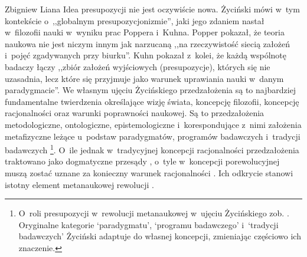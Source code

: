 \begin{artplenv}{Zbigniew Liana}
Idea presupozycji nie jest oczywiście nowa. Życiński
\parencite*[][s.~311n]{zycinski_granice_1993} %
 mówi w~tym kontekście o~,,globalnym presupozycjonizmie'', jaki jego zdaniem nastał w~filozofii nauki w~wyniku prac Poppera i~Kuhna. Popper pokazał, że teoria naukowa nie jest niczym innym jak narzucaną ,,na rzeczywistość siecią założeń i~pojęć zgadywanych przy biurku''. Kuhn pokazał z~kolei, że każdą wspólnotę badaczy łączy ,,zbiór założeń wyjściowych (presupozycje), których się nie uzasadnia, lecz które się przyjmuje jako warunek uprawiania nauki w~danym paradygmacie''. We własnym ujęciu Życińskiego przedzałożenia są to najbardziej fundamentalne twierdzenia określające wizję świata, koncepcję filozofii, koncepcję racjonalności oraz warunki poprawności naukowej. Są to przedzałożenia metodologiczne, ontologiczne, epistemologiczne i~korespondujące z~nimi założenia metafizyczne leżące u~podstaw paradygmatów, programów badawczych i~tradycji badawczych 
\parencites[][s.~7.133]{zycinski_teizm_1985}[][s.~21n.143]{zycinski_structure_1988}[][n. 37nn.253]{zycinski_struktura_2013_liana}%
\footnote{O~roli presupozycji w~rewolucji metanaukowej w~ujęciu Życińskiego zob. 
\parencite[][s.~173–177]{liana_nauka_2019_liana}. %
 Oryginalne kategorie ‘paradygmatu', ‘programu badawczego' i~‘tradycji badawczych' Życiński adaptuje do własnej koncepcji, zmieniając częściowo ich znaczenie.}. O~ile jednak w~tradycyjnej koncepcji racjonalności przedzałożenia traktowano jako dogmatyczne przesądy 
\parencite[][s.~169n]{zycinski_teizm_1985}, %
 o~tyle w~koncepcji porewolucyjnej muszą zostać uznane za konieczny warunek racjonalności 
\parencite[][s.~129.157.172n]{zycinski_teizm_1985}. %
 Ich odkrycie stanowi istotny element metanaukowej rewolucji 
\parencites[][s.~143]{zycinski_structure_1988}[][s.~253]{zycinski_struktura_2013_liana}.%



\end{artplenv}
